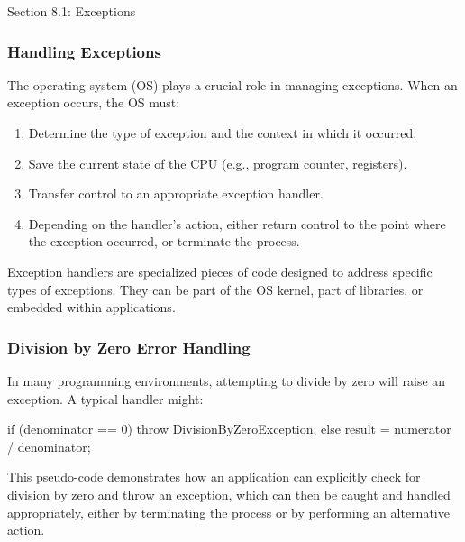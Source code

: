 \begin{notes}{Section 8.1: Exceptions}
    \subsubsection*{Handling Exceptions}
    
    The operating system (OS) plays a crucial role in managing exceptions. When an exception occurs, the OS must:
    
    \begin{enumerate}
        \item Determine the type of exception and the context in which it occurred.
        \item Save the current state of the CPU (e.g., program counter, registers).
        \item Transfer control to an appropriate exception handler.
        \item Depending on the handler's action, either return control to the point where the exception occurred, or terminate the process.
    \end{enumerate}
    
    Exception handlers are specialized pieces of code designed to address specific types of exceptions. They can be part of the OS kernel, part of libraries, or embedded within applications.
    
    \vspace*{1em}
    
    \begin{highlight}
        \subsubsection*{Division by Zero Error Handling}
    
        In many programming environments, attempting to divide by zero will raise an exception. A typical handler might:
    
    \begin{code}[C]
    if (denominator == 0) {
        throw DivisionByZeroException;
    } else {
        result = numerator / denominator;
    }
    \end{code}
    
        This pseudo-code demonstrates how an application can explicitly check for division by zero and throw an exception, which can then be caught and handled appropriately, either by terminating the 
        process or by performing an alternative action.
    \end{highlight}
    

\end{notes}
